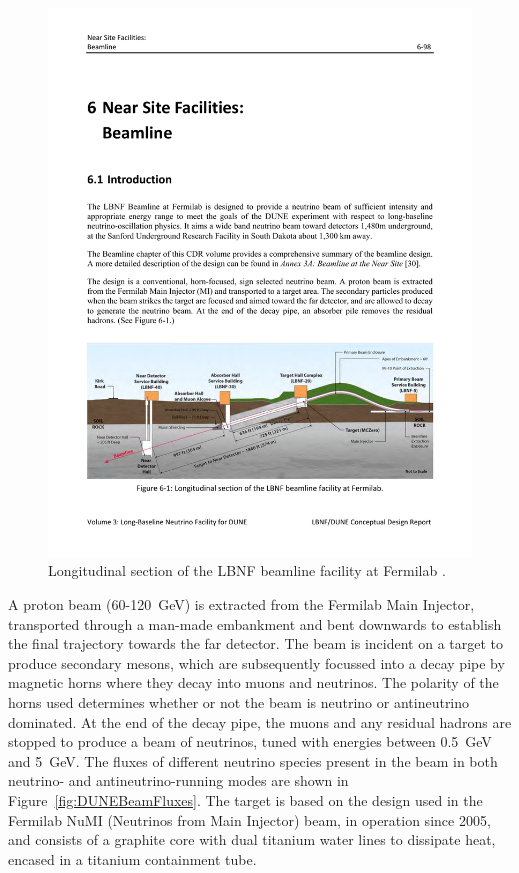 \begin{figure}
  \centering
  \includegraphics[width=14cm]{DUNEBeam.pdf}
  \caption[Longitudinal section of the LBNF beamline facility at Fermilab.]{Longitudinal section of the LBNF beamline facility at Fermilab \cite{DUNECDR3}.}
  \label{fig:DUNEBeam}
\end{figure}

A proton beam (60-120~GeV) is extracted from the Fermilab Main Injector, transported through a man-made embankment and bent downwards to establish the final trajectory towards the far detector.  The beam is incident on a target to produce secondary mesons, which are subsequently focussed into a decay pipe by magnetic horns where they decay into muons and neutrinos.  The polarity of the horns used determines whether or not the beam is neutrino or antineutrino dominated.  At the end of the decay pipe, the muons and any residual hadrons are stopped to produce a beam of neutrinos, tuned with energies between 0.5~GeV and 5~GeV.  The fluxes of different neutrino species present in the beam in both neutrino- and antineutrino-running modes are shown in Figure~\ref{fig:DUNEBeamFluxes}.  The target is based on the design used in the Fermilab NuMI (Neutrinos from Main Injector) beam, in operation since 2005, and consists of a graphite core with dual titanium water lines to dissipate heat, encased in a titanium containment tube.

